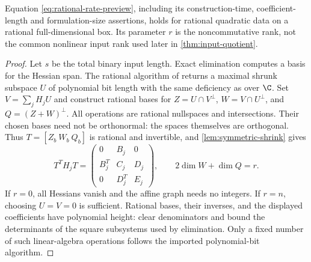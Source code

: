 \begin{theorem}\label{thm:rational-ncrank}
Equation \eqref{eq:rational-rate-preview}, including its construction-time,
coefficient-length and formulation-size assertions, holds for rational
quadratic data on a rational full-dimensional box. Its parameter $r$
is the noncommutative rank, not the common nonlinear input rank used
later in \cref{thm:input-quotient}.
\end{theorem}
\begin{proof}
Let $s$ be the total binary input length. Exact elimination computes a
basis for the Hessian span. The rational algorithm of
\citet[Theorem 1.5 and Lemma 5.3]{iqs2018} returns a maximal shrunk
subspace $U$ of polynomial bit length with the same deficiency as over
$\C$. Set $V=\sum_jH_jU$ and construct rational bases for
$Z=U\cap V^\perp$, $W=V\cap U^\perp$, and $Q=(Z+W)^\perp$.
All operations are rational nullspaces and intersections. Their chosen
bases need not be orthonormal: the spaces themselves are orthogonal.
Thus $T=[Z_b\ W_b\ Q_b]$ is rational and invertible, and
\cref{lem:symmetric-shrink} gives
\[
 T^TH_jT=\begin{pmatrix}0&B_j&0\\ B_j^T&C_j&D_j\\0&D_j^T&E_j\end{pmatrix},
 \qquad 2\dim W+\dim Q=r.
\]
If $r=0$, all Hessians vanish and the affine graph needs no integers.
If $r=n$, choosing $U=V=0$ is sufficient. Rational bases, their inverses,
and the displayed coefficients have polynomial height: clear denominators
and bound the determinants of the square subsystems used by elimination.
Only a fixed number of such linear-algebra operations follows the
imported polynomial-bit algorithm.


\end{proof}
